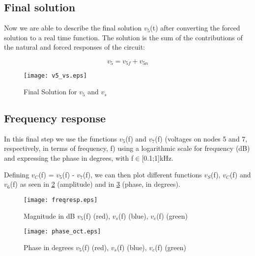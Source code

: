 \subsection{Final solution}

Now we are able to describe the final solution $v_5$(t) after converting the forced solution to a real time function. The solution is the sum of the contributions of the natural and forced responses of the circuit:  

\begin{equation}
  v_5 = v_{5f} + v_{5n}
  \label{eq:kvl20}
\end{equation}

\begin{figure}[h] \centering
\texttt{[image: v5\_vs.eps]}
\caption{Final Solution for $v_5$ and $v_s$}
\label{fig:v5_vs}
\end{figure}
\FloatBarrier

\subsection{Frequency response}

In this final step we use the functions $v_5$(f) and $v_7$(f) (voltages on nodes 5 and 7, respectively, in terms of frequency, f) using a logarithmic scale for frequency (dB) and expressing the phase in degrees, with f$\in$[0.1;1]kHz. \par
Defining $v_C$(f) = $v_5$(f) - $v_7$(f), we can then plot different functions $v_S$(f), $v_C$(f) and $v_6$(f) as seen in \ref{fig:freqresp} (amplitude) and in \ref{fig:phase_oct} (phase, in degrees).


\begin{figure}[h] \centering
\texttt{[image: freqresp.eps]}
\caption{Magnitude in dB $v_5$(f) (red), $v_s$(f) (blue), $v_c$(f) (green)}
\label{fig:freqresp}
\end{figure}
\FloatBarrier

\begin{figure}[h] \centering
\texttt{[image: phase\_oct.eps]}
\caption{Phase in degrees $v_5$(f) (red), $v_s$(f) (blue), $v_c$(f) (green)}
\label{fig:phase_oct}
\end{figure}
\FloatBarrier

















